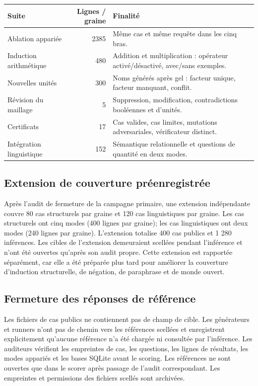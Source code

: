 \documentclass[11pt,a4paper]{article}
\begin{document}
\small\setlength{\tabcolsep}{2pt}
\begin{longtable}{p{}r p{}}
\toprule Suite & Lignes / graine & Finalité \\
\midrule

Ablation appariée & 2385 & Même cas et même requête dans les cinq bras. \\
Induction arithmétique & 480 & Addition et multiplication : opérateur activé/désactivé, avec/sans exemples. \\
Nouvelles unités & 300 & Noms générés après gel : facteur unique, facteur manquant, conflit. \\
Révision du maillage & 5 & Suppression, modification, contradictions booléennes et d’unités. \\
Certificats & 17 & Cas valides, cas limites, mutations adversariales, vérificateur distinct. \\
Intégration linguistique & 152 & Sémantique relationnelle et questions de quantité en deux modes. \\
\bottomrule
\end{longtable}
\normalsize\setlength{\tabcolsep}{6pt}

\subsection{Extension de couverture préenregistrée}
Après l’audit de fermeture de la campagne primaire, une extension indépendante couvre 80 cas structurels par graine et 120 cas linguistiques par graine. Les cas structurels ont cinq modes (400 lignes par graine); les cas linguistiques ont deux modes (240 lignes par graine). L’extension totalise 400 cas publics et 1 280 inférences. Les cibles de l’extension demeuraient scellées pendant l’inférence et n’ont été ouvertes qu’après son audit propre. Cette extension est rapportée séparément, car elle a été préparée plus tard pour améliorer la couverture d’induction structurelle, de négation, de paraphrase et de monde ouvert.

\subsection{Fermeture des réponses de référence}
Les fichiers de cas publics ne contiennent pas de champ de cible. Les générateurs et runners n’ont pas de chemin vers les références scellées et enregistrent explicitement qu’aucune référence n’a été chargée ni consultée par l’inférence. Les auditeurs vérifient les empreintes de cas, les questions, les lignes de résultats, les modes appariés et les bases SQLite avant le scoring. Les références ne sont ouvertes que dans le scorer après passage de l’audit correspondant. Les empreintes et permissions des fichiers scellés sont archivées.
\end{document}
